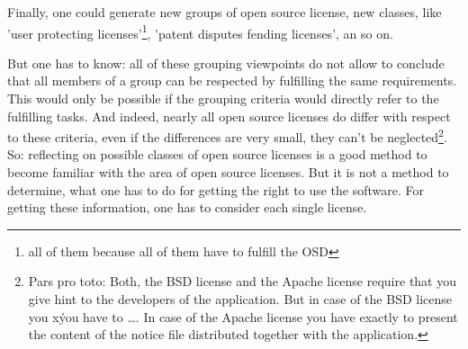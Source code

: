 
Finally, one could generate new groups of open source license, new classes, like
'user protecting licenses'\footnote{all of them because all of them have to
fulfill the OSD}, 'patent disputes fending licenses', an so on.

But one has to know: all of these grouping viewpoints do not allow to conclude
that all members of a group can be respected by fulfilling the same
requirements. This would only be possible if the grouping criteria would
directly refer to the fulfilling tasks. And indeed, nearly all open source
licenses do differ with respect to these criteria, even if the differences are
very small, they can't be neglected\footnote{Pars pro toto: Both, the BSD
license and the Apache license require that you give hint to the developers of
the application. But in case of the BSD license you xýou have to \ldots. In case
of the Apache license you have exactly to present the content of the notice file
distributed together with the application.}. So: reflecting on possible classes
of open source licenses is a good method to become familiar with the area of
open source licenses. But it is not a method to determine, what one has to do
for getting the right to use the software. For getting these information, one
has to consider each single license.


%
